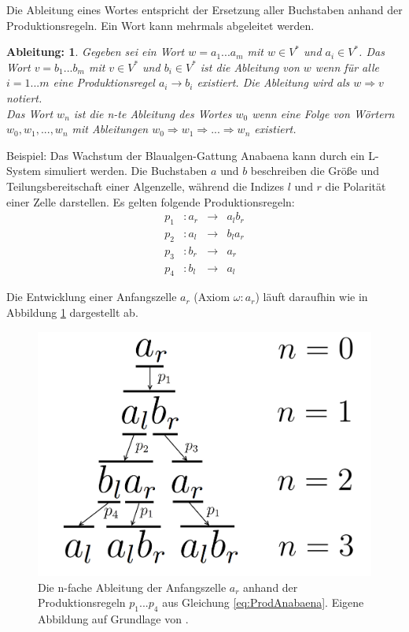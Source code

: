 Die Ableitung eines Wortes entspricht der Ersetzung aller Buchstaben anhand der Produktionsregeln. Ein Wort kann mehrmals abgeleitet werden. 

\newtheorem{defAbleitung}{Ableitung:}[chapter]
\begin{defAbleitung}
	Gegeben sei ein Wort $w = a_1 ... a_m$ mit $w \in V^*$ und $a_i \in V^*$. Das Wort $v = b_1 ... b_m$ mit $v \in V^*$ und $b_i \in V^*$ ist die Ableitung von $w$ wenn für alle $i=1...m$ eine Produktionsregel $a_i \rightarrow b_i$ existiert. Die Ableitung wird als $w \Rightarrow v$ notiert. \\
	Das Wort $w_n$ ist die n-te Ableitung des Wortes $w_0$ wenn eine Folge von Wörtern $w_0, w_1, ..., w_n$ mit Ableitungen $w_0 \Rightarrow w_1 \Rightarrow ... \Rightarrow w_n$ existiert. \cite[S.4]{ABOP:04} 
\end{defAbleitung}


Beispiel: Das Wachstum der Blaualgen-Gattung \glqq Anabaena\grqq{} kann durch ein L-System simuliert werden. Die Buchstaben $a$ und $b$ beschreiben die Größe und Teilungsbereitschaft einer Algenzelle, während die Indizes $l$ und $r$ die Polarität einer Zelle darstellen. Es gelten folgende Produktionsregeln:
\begin{equation}
\begin{array}{cccc}
 p_1 & : a_r &\rightarrow& a_lb_r \\
p_2 &  : a_l &\rightarrow& b_la_r \\ 
p_3 &  : b_r &\rightarrow& a_r \\
p_4 &  : b_l &\rightarrow& a_l 
\end{array}
\label{eq:ProdAnabaena}
\end{equation} 

Die Entwicklung einer Anfangszelle $a_r$ (Axiom $\omega : a_r$) läuft daraufhin wie in Abbildung \ref{fig:AnabaenaAbleitung} dargestellt ab. \cite[S.4]{ABOP:04}
\begin{figure} [hbtp]
	\centering
	\includegraphics[height=0.25\textheight]{images/AnabaenaAbleitung.png}
	\caption{Die n-fache Ableitung der Anfangszelle $a_r$ anhand der Produktionsregeln $p_1 ... p_4$ aus Gleichung \ref{eq:ProdAnabaena}. Eigene Abbildung auf Grundlage von \cite[S.4]{ABOP:04}.}
	\label{fig:AnabaenaAbleitung}
\end{figure}

